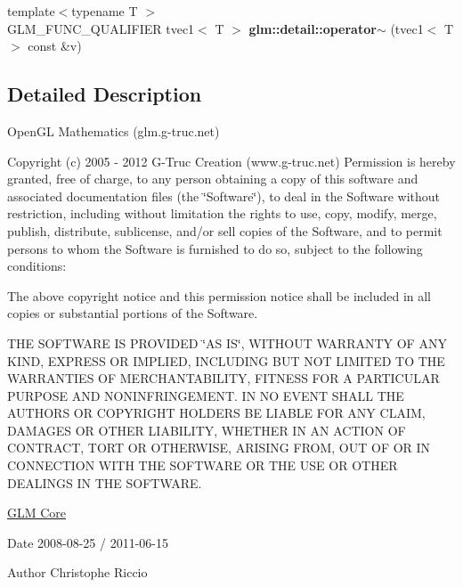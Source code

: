 \begin{DoxyCompactItemize}
\item 
\hypertarget{namespaceglm_1_1detail_a6c38630bb9e02cd25d464e0fffc0e0cc}{{\footnotesize template$<$typename T $>$ }\\\-G\-L\-M\-\_\-\-F\-U\-N\-C\-\_\-\-Q\-U\-A\-L\-I\-F\-I\-E\-R tvec1$<$ \-T $>$ {\bfseries glm\-::detail\-::operator$\sim$} (tvec1$<$ \-T $>$ const \&v)}\label{namespaceglm_1_1detail_a6c38630bb9e02cd25d464e0fffc0e0cc}

\end{DoxyCompactItemize}


\subsection{\-Detailed \-Description}
\-Open\-G\-L \-Mathematics (glm.\-g-\/truc.\-net)

\-Copyright (c) 2005 -\/ 2012 \-G-\/\-Truc \-Creation (www.\-g-\/truc.\-net) \-Permission is hereby granted, free of charge, to any person obtaining a copy of this software and associated documentation files (the \char`\"{}\-Software\char`\"{}), to deal in the \-Software without restriction, including without limitation the rights to use, copy, modify, merge, publish, distribute, sublicense, and/or sell copies of the \-Software, and to permit persons to whom the \-Software is furnished to do so, subject to the following conditions\-:

\-The above copyright notice and this permission notice shall be included in all copies or substantial portions of the \-Software.

\-T\-H\-E \-S\-O\-F\-T\-W\-A\-R\-E \-I\-S \-P\-R\-O\-V\-I\-D\-E\-D \char`\"{}\-A\-S I\-S\char`\"{}, \-W\-I\-T\-H\-O\-U\-T \-W\-A\-R\-R\-A\-N\-T\-Y \-O\-F \-A\-N\-Y \-K\-I\-N\-D, \-E\-X\-P\-R\-E\-S\-S \-O\-R \-I\-M\-P\-L\-I\-E\-D, \-I\-N\-C\-L\-U\-D\-I\-N\-G \-B\-U\-T \-N\-O\-T \-L\-I\-M\-I\-T\-E\-D \-T\-O \-T\-H\-E \-W\-A\-R\-R\-A\-N\-T\-I\-E\-S \-O\-F \-M\-E\-R\-C\-H\-A\-N\-T\-A\-B\-I\-L\-I\-T\-Y, \-F\-I\-T\-N\-E\-S\-S \-F\-O\-R \-A \-P\-A\-R\-T\-I\-C\-U\-L\-A\-R \-P\-U\-R\-P\-O\-S\-E \-A\-N\-D \-N\-O\-N\-I\-N\-F\-R\-I\-N\-G\-E\-M\-E\-N\-T. \-I\-N \-N\-O \-E\-V\-E\-N\-T \-S\-H\-A\-L\-L \-T\-H\-E \-A\-U\-T\-H\-O\-R\-S \-O\-R \-C\-O\-P\-Y\-R\-I\-G\-H\-T \-H\-O\-L\-D\-E\-R\-S \-B\-E \-L\-I\-A\-B\-L\-E \-F\-O\-R \-A\-N\-Y \-C\-L\-A\-I\-M, \-D\-A\-M\-A\-G\-E\-S \-O\-R \-O\-T\-H\-E\-R \-L\-I\-A\-B\-I\-L\-I\-T\-Y, \-W\-H\-E\-T\-H\-E\-R \-I\-N \-A\-N \-A\-C\-T\-I\-O\-N \-O\-F \-C\-O\-N\-T\-R\-A\-C\-T, \-T\-O\-R\-T \-O\-R \-O\-T\-H\-E\-R\-W\-I\-S\-E, \-A\-R\-I\-S\-I\-N\-G \-F\-R\-O\-M, \-O\-U\-T \-O\-F \-O\-R \-I\-N \-C\-O\-N\-N\-E\-C\-T\-I\-O\-N \-W\-I\-T\-H \-T\-H\-E \-S\-O\-F\-T\-W\-A\-R\-E \-O\-R \-T\-H\-E \-U\-S\-E \-O\-R \-O\-T\-H\-E\-R \-D\-E\-A\-L\-I\-N\-G\-S \-I\-N \-T\-H\-E \-S\-O\-F\-T\-W\-A\-R\-E.

\hyperlink{group__core}{\-G\-L\-M \-Core}

\begin{DoxyDate}{\-Date}
2008-\/08-\/25 / 2011-\/06-\/15 
\end{DoxyDate}
\begin{DoxyAuthor}{\-Author}
\-Christophe \-Riccio 
\end{DoxyAuthor}

